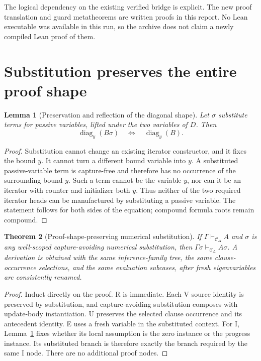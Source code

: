 \documentclass[11pt]{article}
\newtheorem{theorem}{Theorem}[section]
\newtheorem{lemma}[theorem]{Lemma}
\theoremstyle{definition}\newtheorem{definition}[theorem]{Definition}
\theoremstyle{remark}\newtheorem{remark}[theorem]{Remark}
\newcommand{\Cd}{\ensuremath{\mathcal C_{\Delta}}}
\newcommand{\diag}{\operatorname{diag}}
\begin{document}
The logical dependency on the existing verified bridge is explicit. The new proof translation and guard metatheorems are written proofs in this report. No Lean executable was available in this run, so the archive does not claim a newly compiled Lean proof of them.

\section{Substitution preserves the entire proof shape}
\label{sec:substitution}

\begin{lemma}[Preservation and reflection of the diagonal shape]\label{lem:guard-reflection}
Let $\sigma$ substitute terms for passive variables, lifted under the two variables of $D$. Then
\[
 \diag_y(B\sigma)\quad\Longleftrightarrow\quad\diag_y(B).
\]
\end{lemma}
\begin{proof}
Substitution cannot change an existing iterator constructor, and it fixes the bound $y$. It cannot turn a different bound variable into $y$. A substituted passive-variable term is capture-free and therefore has no occurrence of the surrounding bound $y$. Such a term cannot be the variable $y$, nor can it be an iterator with counter and initializer both $y$. Thus neither of the two required iterator heads can be manufactured by substituting a passive variable. The statement follows for both sides of the equation; compound formula roots remain compound.
\end{proof}

\begin{theorem}[Proof-shape-preserving numerical substitution]\label{thm:subst}
If $\Gamma\vdash_{\Cd}A$ and $\sigma$ is any well-scoped capture-avoiding numerical substitution, then $\Gamma\sigma\vdash_{\Cd}A\sigma$. A derivation is obtained with the same inference-family tree, the same clause-occurrence selections, and the same evaluation subcases, after fresh eigenvariables are consistently renamed.
\end{theorem}
\begin{proof}
Induct directly on the proof. R is immediate. Each V source identity is preserved by substitution, and capture-avoiding substitution composes with update-body instantiation. U preserves the selected clause occurrence and its antecedent identity. E uses a fresh variable in the substituted context. For I, Lemma~\ref{lem:guard-reflection} fixes whether its local assumption is the zero instance or the progress instance. Its substituted branch is therefore exactly the branch required by the same I node. There are no additional proof nodes.
\end{proof}
\end{document}

